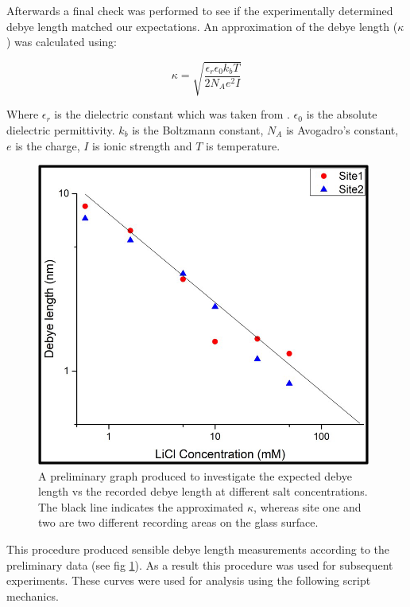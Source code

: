 Afterwards a final check was performed to see if the experimentally determined debye length matched our expectations. An approximation of the debye length ($\kappa$) was calculated using:

\begin{equation}
\kappa = \sqrt{\frac{\epsilon_r \epsilon_0 k_b T}{2 N_A e^2 I}}
\end{equation}

Where $\epsilon_r$ is the dielectric constant which was taken from \cite{WaterGlycerolEpR}. $\epsilon_0$ is the absolute dielectric permittivity. $k_b$ is the Boltzmann constant, $N_A$ is Avogadro's constant,  $e$ is the charge, $I$ is ionic strength and $T$ is temperature.

\begin{figure}[h!]    
        \begin{center}
          \includegraphics[width=110mm]{chapter4/DebyeLength.png}
\end{center}
\caption{A preliminary graph produced to investigate the expected debye length vs the recorded debye length at different salt concentrations. The black line indicates the approximated $\kappa$, whereas site one and two are two different recording areas on the glass surface.}
\label{fig:DebyeLength}                 
\end{figure}

This procedure produced sensible debye length measurements according to the preliminary data (see fig \ref{fig:DebyeLength}). As a result this procedure was used for subsequent experiments. These curves were used for analysis using the following script mechanics.

